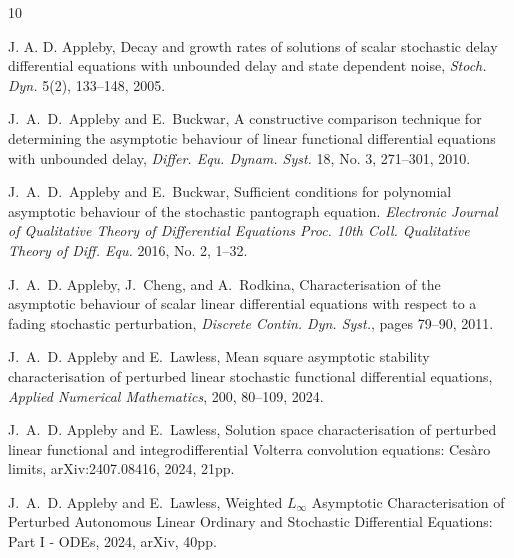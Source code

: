 \documentclass[a4paper,10pt,reqno]{amsart}
\numberwithin{equation}{section}
\theoremstyle{definition}
\theoremstyle{remark}
\DeclareMathOperator{\1}{\mathbbm 1}
\begin{document}

\begin{thebibliography}{10}

J. A. D. Appleby, Decay and growth rates of solutions of scalar stochastic delay differential equations with unbounded delay and state dependent noise, {\em Stoch. Dyn.} 5(2), 133--148, 2005.

J.~A.~D.~Appleby and E.~Buckwar, A constructive comparison technique for determining the asymptotic behaviour of linear functional differential equations with unbounded delay, {\em Differ. Equ. Dynam. Syst.} 18, No. 3, 271--301, 2010.

J.~A.~D.~Appleby and E.~Buckwar, Sufficient conditions for polynomial asymptotic behaviour of the stochastic pantograph equation. 
{\em Electronic Journal of Qualitative Theory of Differential Equations
Proc. 10th Coll. Qualitative Theory of Diff. Equ. }
2016, No. 2, 1--32. 

J.~A.~D. Appleby, J.~Cheng, and A.~Rodkina, 
Characterisation of the asymptotic behaviour of scalar linear differential equations with respect to a fading stochastic perturbation,
{\em Discrete Contin. Dyn. Syst.}, pages 79--90, 2011.

J.~A.~D. Appleby and E.~Lawless, Mean square asymptotic stability characterisation of perturbed linear stochastic functional differential equations, {\em Applied Numerical Mathematics}, 200, 80--109, 2024. 


J.~A.~D. Appleby and E.~Lawless,
\newblock Solution space characterisation of perturbed linear functional and integrodifferential Volterra convolution equations: Ces\`aro limits, arXiv:2407.08416, 2024, 21pp. 


J.~A.~D. Appleby and E.~Lawless, Weighted $L_\infty$ Asymptotic Characterisation of Perturbed Autonomous Linear Ordinary and Stochastic Differential Equations: Part I - ODEs, 2024, arXiv, 40pp.


\end{thebibliography}
\end{document}
